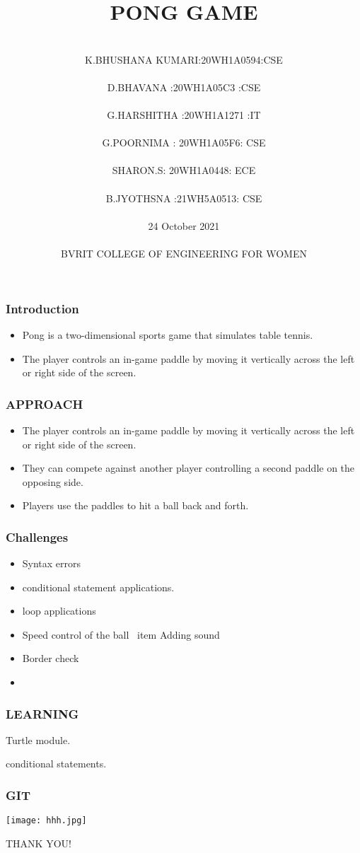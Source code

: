 \documentclass[12pt]{beamer}
\title{ PONG GAME }
\date{}
\author[Bvrith]{
  \\K.BHUSHANA KUMARI:20WH1A0594:CSE\\
  \\D.BHAVANA :20WH1A05C3  :CSE\\
  \\G.HARSHITHA :20WH1A1271 :IT\\ 
  \\G.POORNIMA : 20WH1A05F6: CSE\\
  \\SHARON.S:  20WH1A0448: ECE\\
  \\B.JYOTHSNA :21WH5A0513: CSE \\\vspace{1cm}
  \\24 October 2021\\
  \vspace{2cm} 
 \\ BVRIT COLLEGE OF ENGINEERING FOR WOMEN\\ 
 }
\begin{document}
 
\begin{frame} 
  \titlepage 
\end{frame} 
\begin{frame}
\frametitle{Introduction} 
  \begin{itemize}
      \item Pong is a two-dimensional sports game that simulates table tennis.\item The player controls an in-game paddle by moving it vertically across the left or right side of the screen.
  \end{itemize}
\end{frame}

\begin{frame} 
\frametitle{APPROACH} 
\begin{itemize}
  \item The player controls an in-game paddle by moving it vertically across the left or right side of the screen. \item They can compete against another player controlling a second paddle on the opposing side.\item Players use the paddles to hit a ball back and forth.   
\end{itemize}
\end{frame} 
\begin{frame} 
\frametitle{Challenges}
\begin{itemize}
    \item  Syntax errors \item conditional statement applications.\item loop applications
    \item Speed control of the ball \ item Adding sound \item Border check \item 
\end{itemize}
\end{frame}

\begin{frame}
\frametitle{LEARNING}
\begin{itemsize}
  \item Turtle module.\item conditional statements.
\end{itemsize}
\end{frame}

\begin{frame}
\frametitle{GIT}
\texttt{[image: hhh.jpg]}
\end{frame}

\begin{frame} 
\begin{center}
    THANK YOU!
\end{center} 
\end{frame}
\end{document}
